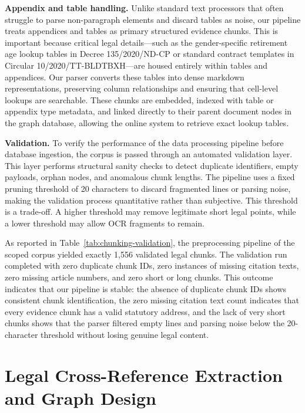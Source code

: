 \textbf{Appendix and table handling.} Unlike standard text processors that often struggle to parse non-paragraph elements and discard tables as noise, our pipeline treats appendices and tables as primary structured evidence chunks. This is important because critical legal details—such as the gender-specific retirement age lookup tables in Decree 135/2020/ND-CP or standard contract templates in Circular 10/2020/TT-BLDTBXH—are housed entirely within tables and appendices. Our parser converts these tables into dense markdown representations, preserving column relationships and ensuring that cell-level lookups are searchable. These chunks are embedded, indexed with table or appendix type metadata, and linked directly to their parent document nodes in the graph database, allowing the online system to retrieve exact lookup tables.

\textbf{Validation.} To verify the performance of the data processing pipeline before database ingestion, the corpus is passed through an automated validation layer. This layer performs structural sanity checks to detect duplicate identifiers, empty payloads, orphan nodes, and anomalous chunk lengths. The pipeline uses a fixed pruning threshold of 20 characters to discard fragmented lines or parsing noise, making the validation process quantitative rather than subjective. This threshold is a trade-off. A higher threshold may remove legitimate short legal points, while a lower threshold may allow OCR fragments to remain.

As reported in Table~\ref{tab:chunking-validation}, the preprocessing pipeline of the scoped corpus yielded exactly 1,556 validated legal chunks. The validation run completed with zero duplicate chunk IDs, zero instances of missing citation texts, zero missing article numbers, and zero short or long chunks. This outcome indicates that our pipeline is stable: the absence of duplicate chunk IDs shows consistent chunk identification, the zero missing citation text count indicates that every evidence chunk has a valid statutory address, and the lack of very short chunks shows that the parser filtered empty lines and parsing noise below the 20-character threshold without losing genuine legal content.


\section{Legal Cross-Reference Extraction and Graph Design}

